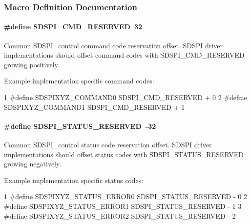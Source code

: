 \subsubsection{Macro Definition Documentation}
\paragraph[{S\+D\+S\+P\+I\+\_\+\+C\+M\+D\+\_\+\+R\+E\+S\+E\+R\+V\+E\+D}]{\setlength{\rightskip}{0pt plus 5cm}\#define S\+D\+S\+P\+I\+\_\+\+C\+M\+D\+\_\+\+R\+E\+S\+E\+R\+V\+E\+D~32}\label{_s_d_s_p_i_8h_a2912b6627b0f64de874048a5ebea2a85}
Common S\+D\+S\+P\+I\+\_\+control command code reservation offset. S\+D\+S\+P\+I driver implementations should offset command codes with S\+D\+S\+P\+I\+\_\+\+C\+M\+D\+\_\+\+R\+E\+S\+E\+R\+V\+E\+D growing positively

Example implementation specific command codes\+: 
\begin{DoxyCode}
1 #define SDSPIXYZ\_COMMAND0        SDSPI\_CMD\_RESERVED + 0
2 #define SDSPIXYZ\_COMMAND1        SDSPI\_CMD\_RESERVED + 1
\end{DoxyCode}
\paragraph[{S\+D\+S\+P\+I\+\_\+\+S\+T\+A\+T\+U\+S\+\_\+\+R\+E\+S\+E\+R\+V\+E\+D}]{\setlength{\rightskip}{0pt plus 5cm}\#define S\+D\+S\+P\+I\+\_\+\+S\+T\+A\+T\+U\+S\+\_\+\+R\+E\+S\+E\+R\+V\+E\+D~-\/32}\label{_s_d_s_p_i_8h_a3037f55e94a7ef536986738c721a690a}
Common S\+D\+S\+P\+I\+\_\+control status code reservation offset. S\+D\+S\+P\+I driver implementations should offset status codes with S\+D\+S\+P\+I\+\_\+\+S\+T\+A\+T\+U\+S\+\_\+\+R\+E\+S\+E\+R\+V\+E\+D growing negatively.

Example implementation specific status codes\+: 
\begin{DoxyCode}
1 #define SDSPIXYZ\_STATUS\_ERROR0   SDSPI\_STATUS\_RESERVED - 0
2 #define SDSPIXYZ\_STATUS\_ERROR1   SDSPI\_STATUS\_RESERVED - 1
3 #define SDSPIXYZ\_STATUS\_ERROR2   SDSPI\_STATUS\_RESERVED - 2
\end{DoxyCode}
